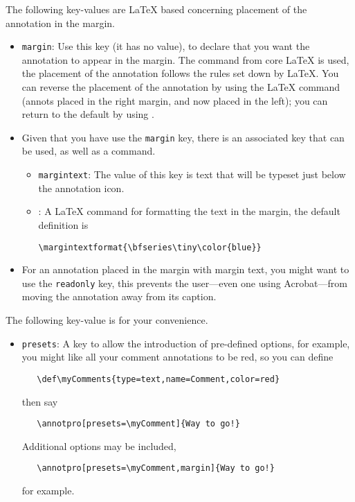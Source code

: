 \documentclass[12pt]{article}
\begin{document}
The following key-values are {\LaTeX} based concerning placement of the annotation in the margin.
\begin{itemize}
  \item \texttt{margin}: Use this key (it has no value), to declare that you want the annotation
        to appear in the margin. The  command from core {\LaTeX} is used, the placement
        of the annotation follows the rules set down by {\LaTeX}.  You can reverse the placement of the
        annotation by using the {\LaTeX} command  (annots placed in the right margin, and now placed in the left);
        you can return to the default by using .

  \item[] Given that you have use the \texttt{margin} key, there is an associated key that can be used, as well
          as a command.
  \begin{itemize}
        \item \texttt{margintext}: The value of this key is text that will be typeset just below the annotation icon.
        \item {}: A {\LaTeX} command for
                formatting the text in the margin, the default definition is\smallskip
\begin{Verbatim}
\margintextformat{\bfseries\tiny\color{blue}}
\end{Verbatim}
    \end{itemize}
    \item[] For an annotation placed in the margin with margin text, you might want to use the \texttt{readonly}
        key, this prevents the user---even one using Acrobat---from moving the annotation away from its caption.
\end{itemize}
The following key-value is for your convenience.
\begin{itemize}
  \item \texttt{presets}: A key to allow the introduction of pre-defined options, for example,
    you might like all your comment annotations to be red, so you can define
\begin{verbatim}
   \def\myComments{type=text,name=Comment,color=red}
\end{verbatim}
then say
\begin{verbatim}
   \annotpro[presets=\myComment]{Way to go!}
\end{verbatim}
Additional options may be included,
\begin{verbatim}
   \annotpro[presets=\myComment,margin]{Way to go!}
\end{verbatim}
for example.

\end{itemize}
\end{document}
